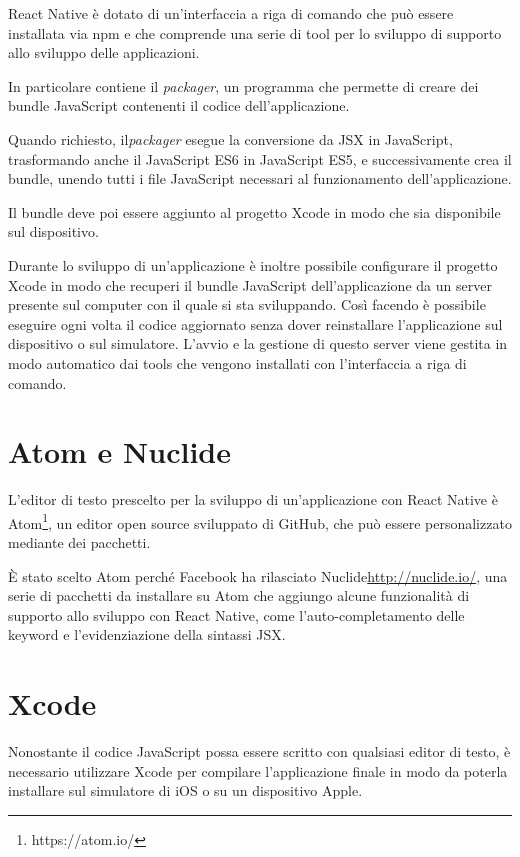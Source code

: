 React Native è dotato di un'interfaccia a riga di comando che può essere installata via npm e che comprende una serie di tool per lo sviluppo di supporto allo sviluppo delle applicazioni.

In particolare contiene il \textit{packager}, un programma che permette di creare dei bundle JavaScript contenenti il codice dell'applicazione.

Quando richiesto, il\textit{packager} esegue la conversione da JSX in JavaScript, trasformando anche il JavaScript ES6 in JavaScript ES5, e successivamente crea il bundle, unendo tutti i file JavaScript necessari al funzionamento dell'applicazione.

Il bundle deve poi essere aggiunto al progetto Xcode in modo che sia disponibile sul dispositivo.

Durante lo sviluppo di un'applicazione è inoltre possibile configurare il progetto Xcode in modo che recuperi il bundle JavaScript dell'applicazione da un server presente sul computer con il quale si sta sviluppando.
Così facendo è possibile eseguire ogni volta il codice aggiornato senza dover reinstallare l'applicazione sul dispositivo o sul simulatore.
L'avvio e la gestione di questo server viene gestita in modo automatico dai tools che vengono installati con l'interfaccia a riga di comando.

\section{Atom e Nuclide}

L'editor di testo prescelto per la sviluppo di un'applicazione con React Native è Atom\footnote{https://atom.io/}, un editor open source sviluppato di GitHub, che può essere personalizzato mediante dei pacchetti.

\`E stato scelto Atom perché Facebook ha rilasciato Nuclide\url{http://nuclide.io/}, una serie di pacchetti da installare su Atom che aggiungo alcune funzionalità di supporto allo sviluppo con React Native, come l'auto-completamento delle keyword e l'evidenziazione della sintassi JSX.

\section{Xcode}

Nonostante il codice JavaScript possa essere scritto con qualsiasi editor di testo, è necessario utilizzare Xcode per compilare l'applicazione finale in modo da poterla installare sul simulatore di iOS o su un dispositivo Apple.

